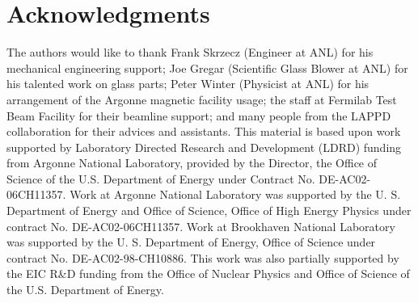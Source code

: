 \section{Acknowledgments}
The authors would like to thank Frank Skrzecz (Engineer at ANL) for his 
mechanical engineering support; Joe Gregar (Scientific Glass Blower at ANL) for 
his talented work on glass parts; Peter Winter (Physicist at ANL) for his 
arrangement of the Argonne magnetic facility usage; the staff at Fermilab Test 
Beam Facility for their beamline support; and many people from the LAPPD 
collaboration for their advices and assistants. This material is based upon 
work supported by Laboratory Directed Research and Development (LDRD) funding 
from Argonne National Laboratory, provided by the Director, the Office of 
Science of the U.S. Department of Energy under Contract No. DE-AC02-06CH11357.  
Work at Argonne National Laboratory was supported by the U. S. Department of 
Energy and Office of Science, Office of High Energy Physics under contract No.  
DE-AC02-06CH11357. Work at Brookhaven National Laboratory was supported by the 
U. S. Department of Energy, Office of Science under contract No.  
DE-AC02-98-CH10886. This work was also partially supported by the EIC R{\&}D 
funding from the Office of Nuclear Physics and Office of Science of the U.S.  
Department of Energy.
